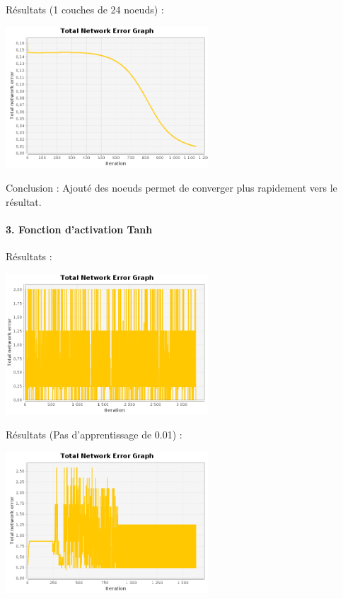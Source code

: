\documentclass[10pt]{report}
\begin{document}
Résultats (1 couches de 24 noeuds) :\\
\begin{center}
\includegraphics[height=200px]{img/EQ_EG_7.png}\\
\end{center}

Conclusion : Ajouté des noeuds permet de converger plus rapidement vers le résultat.

\paragraph{3. Fonction d'activation Tanh}

Résultats  :\\
\begin{center}
\includegraphics[height=200px]{img/EQ_EG_8.png}\\
\end{center}

Résultats (Pas d'apprentissage de 0.01) :\\
\begin{center}
\includegraphics[height=200px]{img/EQ_EG_9.png}\\
\end{center}
\end{document}
